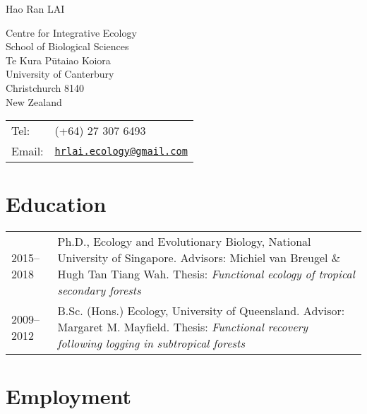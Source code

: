 \documentclass[a4paper]{article}
\def\name{Hao Ran LAI}
\begin{document}
{\huge \name}


\vspace{0.25in}

\begin{minipage}{0.45\linewidth}
  Centre for Integrative Ecology \\
  School of Biological Sciences \\
  Te Kura Pūtaiao Koiora  \\
  University of Canterbury \\
  Christchurch 8140 \\
  New Zealand
\end{minipage}
\begin{minipage}{0.45\linewidth}
  \begin{tabular}{ll}
    Tel:   & (+64) 27 307 6493 \\
    Email: & \href{mailto:hrlai.ecology@gmail.com}{\tt hrlai.ecology@gmail.com} \\
  \end{tabular}
\end{minipage}



\section*{Education}

\begin{tabular}{p{0.13\linewidth} p{0.87\linewidth}}

2015--2018 & Ph.D., Ecology and Evolutionary Biology, National University of Singapore. Advisors: Michiel van Breugel \& Hugh Tan Tiang Wah. Thesis: \textit{Functional ecology of tropical secondary forests} \\

2009--2012 & B.Sc. (Hons.) Ecology, University of Queensland. Advisor: Margaret M. Mayfield. Thesis: \textit{Functional recovery following logging in subtropical forests}\\

\end{tabular}


\section*{Employment}
\end{document}

